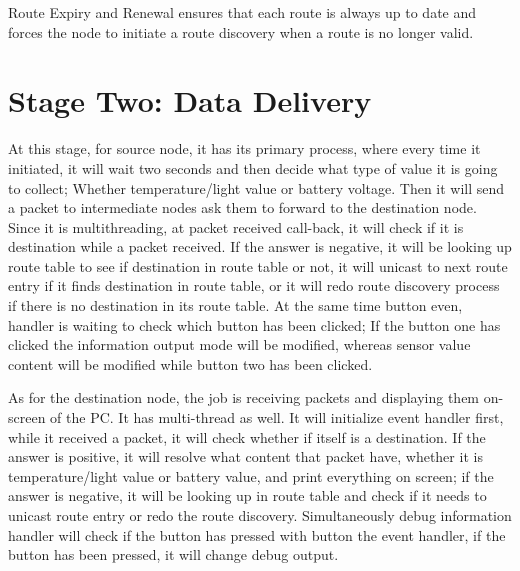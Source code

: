 Route Expiry and Renewal ensures that each route is always up to date and forces the node to initiate a route discovery when a route is no longer valid.

\section{Stage Two: Data Delivery}

At this stage, for source node, it has its primary process, where every time it initiated, it will wait two seconds and then decide what type of value it is going to collect; Whether temperature/light value or battery voltage. Then it will send a packet to intermediate nodes ask them to forward to the destination node. Since it is multithreading, at packet received call-back, it will check if it is destination while a packet received. If the answer is negative, it will be looking up route table to see if destination in route table or not, it will unicast to next route entry if it finds destination in route table, or it will redo route discovery process if there is no destination in its route table. At the same time button even, handler is waiting to check which button has been clicked; If the button one has clicked the information output mode will be modified, whereas sensor value content will be modified while button two has been clicked.

As for the destination node, the job is receiving packets and displaying them on-screen of the PC. It has multi-thread as well. It will initialize event handler first, while it received a packet, it will check whether if itself is a destination. If the answer is positive, it will resolve what content that packet have, whether it is temperature/light value or battery value, and print everything on screen; if the answer is negative, it will be looking up in route table and check if it needs to unicast route entry or redo the route discovery. Simultaneously debug information handler will check if the button has pressed with button the event handler, if the button has been pressed, it will change debug output. 






